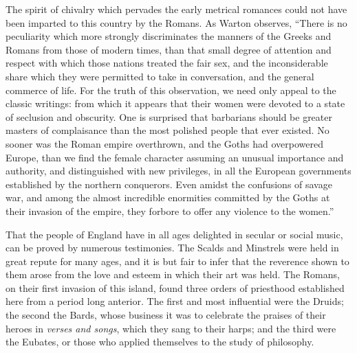 The spirit of chivalry which pervades the early metrical romances could not
have been imparted to this country by the Romans. As Warton observes,
“There is no peculiarity which more strongly discriminates the manners of the
Greeks and Romans from those of modern times, than that small degree of attention
and respect with which those nations treated the fair sex, and the inconsiderable
share which they were permitted to take in conversation, and the general
commerce of life. For the truth of this observation, we need only appeal to the
classic writings: from which it appears that their women were devoted to a state
of seclusion and obscurity. One is surprised that barbarians should be greater
masters of complaisance than the most polished people that ever existed. No
sooner was the Roman empire overthrown, and the Goths had overpowered
Europe, than we find the female character assuming an unusual importance and
authority, and distinguished with new privileges, in all the European governments
established by the northern conquerors. Even amidst the confusions of
savage war, and among the almost incredible enormities committed by the Goths
at their invasion of the empire, they forbore to offer any violence to the women.”

That the people of England have in all ages delighted in secular or social
music, can be proved by numerous testimonies. The Scalds and Minstrels were
held in great repute for many ages, and it is but fair to infer that the reverence
shown to them arose from the love and esteem in which their art was held. The
Romans, on their first invasion of this island, found three orders of priesthood
established here from a period long anterior. The first and most influential were
the Druids; the second the Bards, whose business it was to celebrate the praises
of their heroes in \textit{verses and songs}, which they sang to their harps; and the third
were the Eubates, or those who applied themselves to the study of philosophy.



